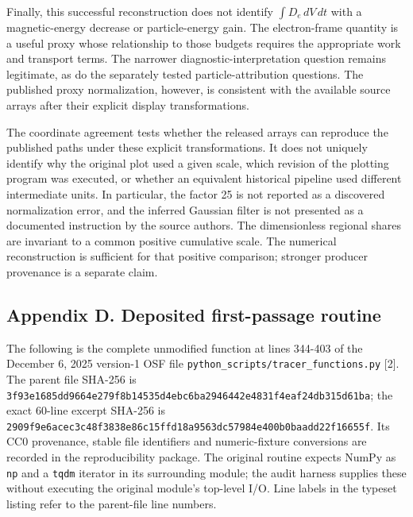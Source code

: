 Finally, this successful reconstruction does not identify
\(\int D_e\,dV\,dt\) with a magnetic-energy decrease or particle-energy
gain. The electron-frame quantity is a useful proxy whose relationship
to those budgets requires the appropriate work and transport terms. The
narrower diagnostic-interpretation question remains legitimate, as do
the separately tested particle-attribution questions. The published
proxy normalization, however, is consistent with the available source
arrays after their explicit display transformations.

The coordinate agreement tests whether the released arrays can reproduce
the published paths under these explicit transformations. It does not
uniquely identify why the original plot used a given scale, which
revision of the plotting program was executed, or whether an equivalent
historical pipeline used different intermediate units. In particular,
the factor 25 is not reported as a discovered normalization error, and
the inferred Gaussian filter is not presented as a documented
instruction by the source authors. The dimensionless regional shares are
invariant to a common positive cumulative scale. The numerical
reconstruction is sufficient for that positive comparison; stronger
producer provenance is a separate claim.

\subsection{Appendix D. Deposited first-passage
routine}\label{appendix-d.-deposited-first-passage-routine}

The following is the complete unmodified function at lines 344-403 of
the December 6, 2025 version-1 OSF file
\nolinkurl{python_scripts/tracer_functions.py} {[}2{]}. The parent file
SHA-256 is
\nolinkurl{3f93e1685dd9664e279f8b14535d4ebc6ba2946442e4831f4eaf24db315d61ba};
the exact 60-line excerpt SHA-256 is
\nolinkurl{2909f9e6acec3c48f3838e86c15ffd18a9563dc57984e400b0baadd22f16655f}.
Its CC0 provenance, stable file identifiers and numeric-fixture
conversions are recorded in the reproducibility package. The original
routine expects NumPy as \nolinkurl{np} and a \nolinkurl{tqdm} iterator in its
surrounding module; the audit harness supplies these without executing
the original module's top-level I/O. Line labels in the typeset listing
refer to the parent-file line numbers.

